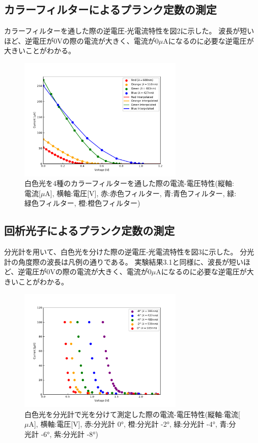 \documentclass[a4paper,12pt]{jsarticle}
\begin{document}
\subsection{カラーフィルターによるプランク定数の測定}
カラーフィルターを通した際の逆電圧‐光電流特性を図2に示した。
波長が短いほど、逆電圧が0Vの際の電流が大きく、電流が0$\mu$Aになるのに必要な逆電圧が大きいことがわかる。
\begin{figure}[H]
\centering
\includegraphics[width=0.7\textwidth]{figs/plot.pdf}
\caption{白色光を4種のカラーフィルターを通した際の電流-電圧特性(縦軸:電流[$\mu$A], 横軸:電圧[V], 赤:赤色フィルター, 青:青色フィルター, 緑:緑色フィルター, 橙:橙色フィルター)}
\end{figure}

\subsection{回析光子によるプランク定数の測定}
分光計を用いて、白色光を分けた際の逆電圧‐光電流特性を図3に示した。
分光計の角度際の波長は凡例の通りである。
実験結果3.1と同様に、波長が短いほど、逆電圧が0Vの際の電流が大きく、電流が0$\mu$Aになるのに必要な逆電圧が大きいことがわかる。
\begin{figure}[H]
  \centering
  \includegraphics[width=0.7\textwidth]{figs/plot2.pdf}
  \caption{白色光を分光計で光を分けて測定した際の電流-電圧特性(縦軸:電流[$\mu$A], 横軸:電圧[V], 赤:分光計 0°, 橙:分光計 -2°, 緑:分光計 -4°, 青:分光計 -6°, 紫:分光計 -8°)}
  \end{figure}
\end{document}
